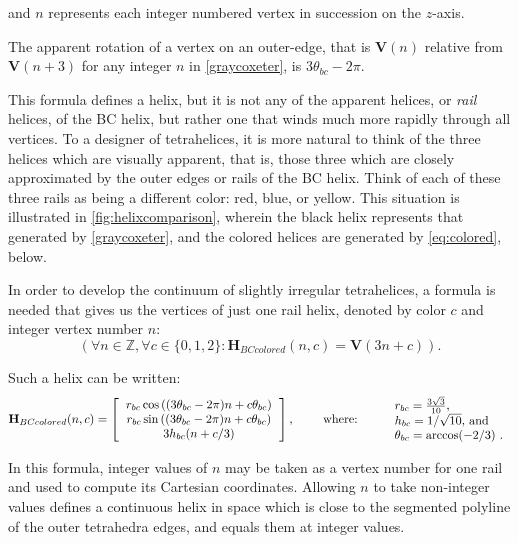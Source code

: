 \documentclass[10pt,final]{journals-1.0/asme2ej}
\renewcommand{\vec}[1]{\mathbf{#1}}
\begin{document}
and $n$ represents each integer numbered vertex in succession on the $z$-axis.

The apparent rotation of a vertex on an outer-edge, that is $\vec{V}(n)$ relative from $\vec{V}(n+3)$
for any integer $n$
in \cref{graycoxeter}, is $3 \theta_{bc} - 2\pi$.

This formula defines a helix, but it is not any of the apparent helices, or \emph{rail} helices, of the
BC helix, but rather one that winds much more rapidly through all
vertices. To a designer of tetrahelices, it is more natural to think of
the three helices which are visually apparent, that is, those three
which are closely approximated by the outer edges or rails of
the BC helix. Think of each of these three rails as being a different color: red, blue, or yellow.
This situation is illustrated in \cref{fig:helixcomparison}, wherein the black helix represents that
generated by \cref{graycoxeter},
and the colored helices are generated by \cref{eq:colored}, below. 

In order to develop the continuum of slightly irregular tetrahelices,
a formula is needed
that gives us the vertices of just
one rail helix, denoted by color $c$ and integer vertex number $n$:
\[
(\forall n \in \mathbb{Z}, \forall c \in \{0,1,2\} : \vec{H}_{BCcolored}(n,c) = \vec{V}(3n +c)) .
\]

Such a helix can be written:
\begin{equation}
  \label{eq:colored}
 \vec{H}_{BCcolored}(n,c) =
\left [
  \begin{tabular}{c}
   $ r_{bc}  \cos{((3 \theta_{bc} - 2 \pi)n + c  \theta_{bc})}  $\\
   $ r_{bc} \sin{((3 \theta_{bc} - 2 \pi)n + c  \theta_{bc})} $\\
   $ 3 h_{bc} (n + c/3)  $
  \end{tabular}
  \right ],
\text{ \qquad where:  \qquad}
  \begin{tabular}{l}
 $ r_{bc} = \frac{3\sqrt{3}}{10} $,\\
 $ h_{bc} = 1/\sqrt{10} $, and \\
 $ \theta_{bc} = \arccos(-2/3) $ \text{.}\\
  \end{tabular}      
\end{equation}

In this formula, integer values of $n$ may be taken as a vertex number for one rail and used to compute
its Cartesian
coordinates. Allowing $n$ to take non-integer values defines a continuous
helix in space which is close to the segmented polyline of the outer
tetrahedra edges, and equals them at integer
values.
\end{document}
